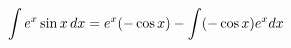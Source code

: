 \documentclass[preview]{standalone}
\begin{document}
\begin{align*}
\special{dvisvgm:raw <g id='unique000'>}\int e^x \sin x \, dx = e^x(-\cos x) - \int(-\cos x)e^x dx\special{dvisvgm:raw </g>}
\end{align*}
\end{document}
